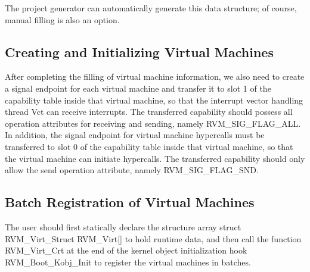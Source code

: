 The project generator can automatically generate this data structure; of course, manual filling is also an option.

\subsection{Creating and Initializing Virtual Machines}\label{subsec:4-2-2}

After completing the filling of virtual machine information, we also need to create a signal endpoint for each virtual machine and transfer it to slot 1 of the capability table inside that virtual machine, so that the interrupt vector handling thread Vct can receive interrupts. The transferred capability should possess all operation attributes for receiving and sending, namely RVM\_SIG\_FLAG\_ALL. In addition, the signal endpoint for virtual machine hypercalls must be transferred to slot 0 of the capability table inside that virtual machine, so that the virtual machine can initiate hypercalls. The transferred capability should only allow the send operation attribute, namely RVM\_SIG\_FLAG\_SND.

\subsection{Batch Registration of Virtual Machines}\label{subsec:4-2-3}

The user should first statically declare the structure array struct RVM\_Virt\_Struct RVM\_Virt{[}{]} to hold runtime data, and then call the function RVM\_Virt\_Crt at the end of the kernel object initialization hook RVM\_Boot\_Kobj\_Init to register the virtual machines in batches.

